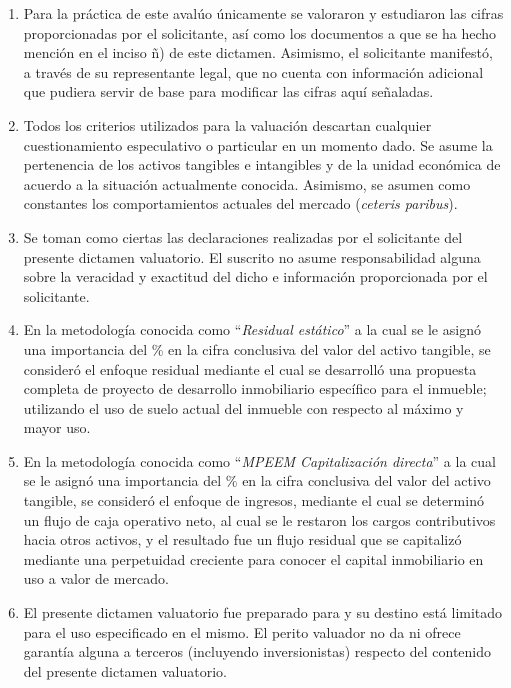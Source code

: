 \begin{enumerate}[\indent a)]
\item Para la pr\'actica de este aval\'uo \'unicamente se valoraron y estudiaron las cifras proporcionadas por el solicitante, as\'i como los documentos a que se ha hecho menci\'on en el inciso \~n) de este dictamen. Asimismo, el solicitante manifest\'o, a trav\'es de su representante legal, que no cuenta con informaci\'on adicional que pudiera servir de base para modificar las cifras aqu\'i se\~naladas. 


\item Todos los criterios utilizados para la valuaci\'on descartan cualquier cuestionamiento especulativo o particular en un momento dado. Se asume la pertenencia de los activos tangibles e intangibles y de la unidad econ\'omica de acuerdo a la situaci\'on actualmente conocida. Asimismo, se asumen como constantes los comportamientos actuales del mercado (\textit{ceteris paribus}).

\item Se toman como ciertas las declaraciones realizadas por el solicitante del presente dictamen valuatorio. El suscrito no asume responsabilidad alguna sobre la veracidad y exactitud del dicho e  informaci\'on proporcionada por el solicitante.

\item En la metodolog\'ia conocida como ``\textit{Residual est\'atico}'' a la cual se le asign\'o una importancia del \% en la cifra conclusiva del valor del activo tangible, se consider\'o el enfoque residual mediante el cual se desarroll\'o una propuesta completa de proyecto de desarrollo inmobiliario espec\'ifico para el inmueble; utilizando el uso de suelo actual del inmueble con respecto al m\'aximo y mayor uso.

\item En la metodolog\'ia conocida como ``\textit{MPEEM Capitalizaci\'on directa}'' a la cual se le asign\'o una importancia del \% en la cifra conclusiva del valor del activo tangible, se consider\'o el enfoque de ingresos, mediante el cual se determin\'o un flujo de caja operativo neto, al cual se le restaron los cargos contributivos hacia otros activos, y el resultado fue un flujo residual que se capitaliz\'o mediante una perpetuidad creciente para conocer el capital inmobiliario en uso a valor de mercado.

\item El presente dictamen valuatorio fue preparado para \textcolor{principal}{\empresaSolicitante}{} y su destino est\'a limitado para el uso especificado  en el mismo. El perito valuador no da ni ofrece garant\'ia alguna a terceros (incluyendo inversionistas) respecto del contenido del presente dictamen valuatorio.

\end{enumerate}



